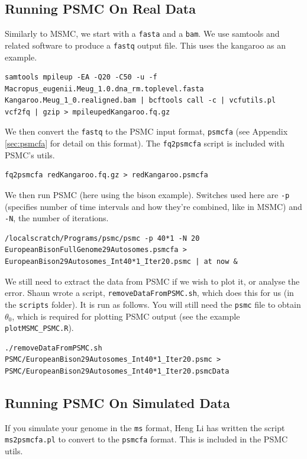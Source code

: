 \documentclass[11pt,a4paper]{article}
\begin{document}
\subsection{Running PSMC On Real Data}
Similarly to MSMC, we start with a \texttt{fasta} and a \texttt{bam}. We use samtools and related software to produce a \texttt{fastq} output file. This uses the kangaroo as an example.
\begin{lstlisting}
samtools mpileup -EA -Q20 -C50 -u -f Macropus_eugenii.Meug_1.0.dna_rm.toplevel.fasta Kangaroo.Meug_1_0.realigned.bam | bcftools call -c | vcfutils.pl vcf2fq | gzip > mpileupedKangaroo.fq.gz
\end{lstlisting}
We then convert the \texttt{fastq} to the PSMC input format, \texttt{psmcfa} (see Appendix \ref{sec:psmcfa} for detail on this format). The \texttt{fq2psmcfa} script is included with PSMC's utils.
\begin{lstlisting}
fq2psmcfa redKangaroo.fq.gz > redKangaroo.psmcfa
\end{lstlisting}
We then run PSMC (here using the bison example). Switches used here are \texttt{-p} (specifies number of time intervals and how they're combined, like in MSMC) and \texttt{-N}, the number of iterations.
\begin{lstlisting}
/localscratch/Programs/psmc/psmc -p 40*1 -N 20 EuropeanBisonFullGenome29Autosomes.psmcfa > EuropeanBison29Autosomes_Int40*1_Iter20.psmc | at now &
\end{lstlisting}
We still need to extract the data from PSMC if we wish to plot it, or analyse the error. Shaun wrote a script, \texttt{removeDataFromPSMC.sh}, which does this for us (in the \texttt{scripts} folder). It is run as follows. You will still need the \texttt{psmc} file to obtain $\theta_0$, which is required for plotting PSMC output (see the example \texttt{plotMSMC\_PSMC.R}).
\begin{lstlisting}
./removeDataFromPSMC.sh PSMC/EuropeanBison29Autosomes_Int40*1_Iter20.psmc > PSMC/EuropeanBison29Autosomes_Int40*1_Iter20.psmcData
\end{lstlisting}

\subsection{Running PSMC On Simulated Data}
If you simulate your genome in the \texttt{ms} format, Heng Li has written the script \texttt{ms2psmcfa.pl} to convert to the \texttt{psmcfa} format. This is included in the PSMC utils.
\end{document}
